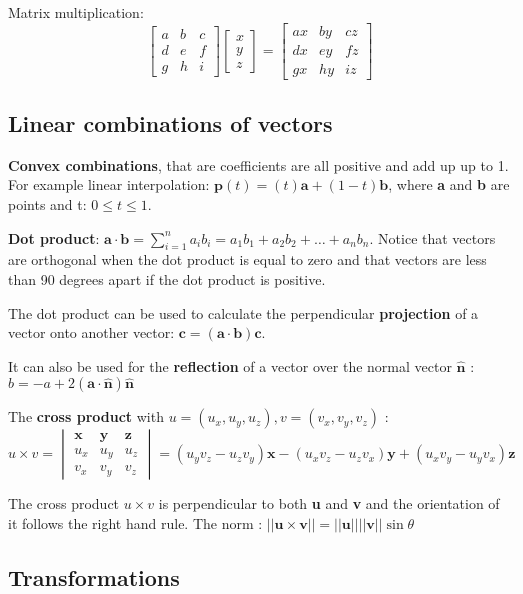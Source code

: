 	Matrix multiplication:
	\begin{equation}
	\begin{bmatrix} a& b& c \\ 
	                d& e& f \\
	                g& h& i\end{bmatrix} 
	                \begin{bmatrix} x \\ y \\ z \end{bmatrix} = 
	                \begin{bmatrix} ax& by& cz \\ 
	                dx& ey& fz \\
	                gx& hy& iz\end{bmatrix}           
	\end{equation}

	\subsection*{Linear combinations of vectors} 
	\textbf{Convex combinations}, that are coefficients are all positive and add up up to 1. For example linear interpolation: $\textbf{p}(t) = (t)\textbf{a} + (1-t)\textbf{b}$, where \textbf{a} and \textbf{b} are points and t: $0 \le t \le 1$. 

	\textbf{Dot product}: $\textbf{a} \cdot \textbf{b} = \sum_{i=1}^{n} a_i b_i = a_1b_1 + a_2b_2 + \ldots + a_nb_n$. Notice that vectors are orthogonal when the dot product is equal to zero and that vectors are less than 90 degrees apart if the dot product is positive. 

	The dot product can be used to calculate the perpendicular \textbf{projection} of a vector onto another vector: $\textbf{c} = (\textbf{a} \cdot \textbf{b})\textbf{c}$. 

	It can also be used for the \textbf{reflection} of a vector over the normal vector $\hat{\textbf{n}}$ : $b = -a + 2(\textbf{a} \cdot \hat{\textbf{n}})\hat{\textbf{n}}$

	The \textbf{cross product} with $u = (u_x,u_y,u_z), v = (v_x,v_y,v_z)$ : 
	\begin{equation}
	 	u \times v = \begin{vmatrix}
     \textbf{x} & \textbf{y} & \textbf{z}\\ 
     u_{x} & u_{y} & u_{z}\\
     v_{x} & v_{y} & v_{z} 
	\end{vmatrix} = (u_yv_z-u_zv_y)\textbf{x} - (u_xv_z - u_zv_x)\textbf{y} + (u_xv_y-u_yv_x)\textbf{z}
	\end{equation} 

	The cross product $u \times v$ is perpendicular to both \textbf{u} and \textbf{v} and the orientation of it follows the right hand rule. The norm : $||\textbf{u} \times \textbf{v}|| = ||\textbf{u}|| ||\textbf{v}|| \sin \theta$

	\subsection*{Transformations}
	  









